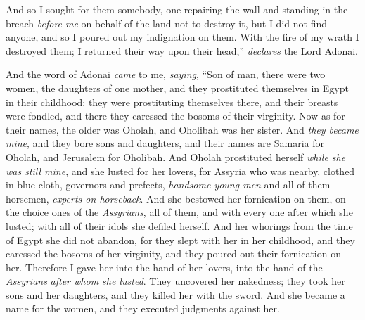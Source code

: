 \begin{biblechapter}
\verse And so I sought for them somebody, one repairing the wall and standing in the breach \textit{before me} on behalf of the land not to destroy it, but I did not find anyone,
\verse and so I poured out my indignation on them. With the fire of my wrath I destroyed them; I returned their way upon their head,” \textit{declares} the Lord Adonai.
\end{biblechapter}

\begin{biblechapter} %
 And the word of Adonai \textit{came} to me, \textit{saying},
\verse “Son of man, there were two women, the daughters of one mother,
\verse and they prostituted themselves in Egypt in their childhood; they were prostituting themselves there, and their breasts were fondled, and there they caressed the bosoms of their virginity.
\verse Now as for their names, the older was Oholah, and Oholibah was her sister. And \textit{they became mine}, and they bore sons and daughters, and their names are Samaria for Oholah, and Jerusalem for Oholibah.
\verse And Oholah prostituted herself \textit{while she was still mine}, and she lusted for her lovers, for Assyria who was nearby,
\verse clothed in blue cloth, governors and prefects, \textit{handsome young men} and all of them horsemen, \textit{experts on horseback}.
\verse And she bestowed her fornication on them, on the choice ones of the \textit{Assyrians}, all of them, and with every one after which she lusted; with all of their idols she defiled herself.
\verse And her whorings from the time of Egypt she did not abandon, for they slept with her in her childhood, and they caressed the bosoms of her virginity, and they poured out their fornication on her.
\verse Therefore I gave her into the hand of her lovers, into the hand of the \textit{Assyrians} \textit{after whom she lusted}.
\verse They uncovered her nakedness; they took her sons and her daughters, and they killed her with the sword. And she became a name for the women, and they executed judgments against her.

\end{biblechapter}

